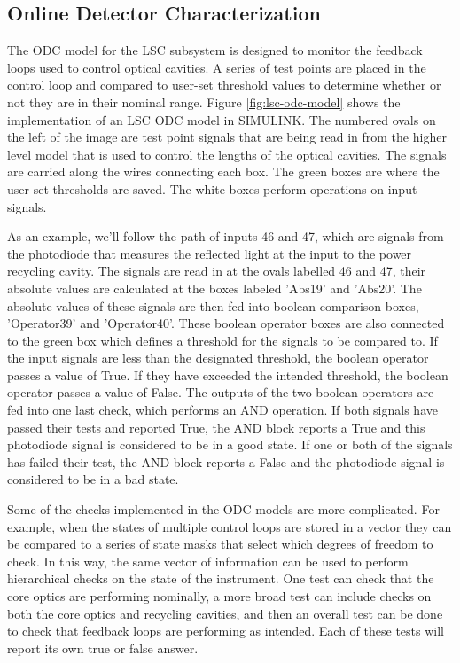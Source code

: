 \subsection{Online Detector Characterization}

The ODC model for the LSC subsystem is designed to monitor the feedback 
loops used to control optical cavities. A series of test points are placed 
in the control loop and compared to user-set threshold values to determine 
whether or not they are in their nominal range. 
Figure \ref{fig:lsc-odc-model} shows the implementation of an LSC ODC 
model in SIMULINK. The numbered ovals on the left of the image are test point 
signals that are being read in from the higher level model that is used to control the 
lengths of the optical cavities. The signals are carried along the wires connecting 
each box. The green boxes are where the user set thresholds are saved. The white 
boxes perform operations on input signals.

As an example, we'll follow the path of inputs 46 and 47, which are signals from 
the photodiode that measures the reflected light at the input to the power recycling 
cavity. The signals are read in at the ovals labelled 46 and 47, their absolute values 
are calculated at the boxes labeled 'Abs19' and 'Abs20'. The absolute values of these 
signals are then fed into boolean comparison boxes, 'Operator39' and 'Operator40'. 
These boolean operator boxes are also connected to the green box which defines a 
threshold for the signals to be compared to. If the input signals are less than the 
designated threshold, the boolean operator passes a value of True. If they have 
exceeded the intended threshold, the boolean operator passes a value of False. 
The outputs of the two boolean operators are fed into one last check, which performs 
an AND operation. If both signals have passed their tests and reported True, the AND 
block reports a True and this photodiode signal is considered to be in a good state. 
If one or both of the signals has failed their test, the AND block reports a False 
and the photodiode signal is considered to be in a bad state. 

Some of the checks implemented in the ODC models are more complicated. For 
example, when 
the states of multiple control loops are stored in a vector they can be compared to a 
series of state masks that select which degrees of freedom to check. 
In this way, the same vector of information can be used to perform hierarchical 
checks on the state of the instrument. 
One test can check that the core optics are performing nominally, a more broad 
test can include checks on both the core optics and recycling cavities, and 
then an overall test can be done to check that feedback loops are performing as intended. 
Each of these tests will report its own true or false answer. 

